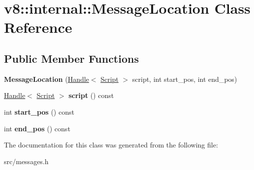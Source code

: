 \hypertarget{classv8_1_1internal_1_1_message_location}{}\section{v8\+:\+:internal\+:\+:Message\+Location Class Reference}
\label{classv8_1_1internal_1_1_message_location}
\subsection*{Public Member Functions}
\begin{DoxyCompactItemize}
\item 
\hypertarget{classv8_1_1internal_1_1_message_location_ab3acbbdff769f414fbae9f269e805e06}{}{\bfseries Message\+Location} (\hyperlink{classv8_1_1internal_1_1_handle}{Handle}$<$ \hyperlink{classv8_1_1internal_1_1_script}{Script} $>$ script, int start\+\_\+pos, int end\+\_\+pos)\label{classv8_1_1internal_1_1_message_location_ab3acbbdff769f414fbae9f269e805e06}

\item 
\hypertarget{classv8_1_1internal_1_1_message_location_aa98b33884231005b9cfed256d8419ad1}{}\hyperlink{classv8_1_1internal_1_1_handle}{Handle}$<$ \hyperlink{classv8_1_1internal_1_1_script}{Script} $>$ {\bfseries script} () const \label{classv8_1_1internal_1_1_message_location_aa98b33884231005b9cfed256d8419ad1}

\item 
\hypertarget{classv8_1_1internal_1_1_message_location_aa22e9e2ef0cee82c768d66a65c7f318f}{}int {\bfseries start\+\_\+pos} () const \label{classv8_1_1internal_1_1_message_location_aa22e9e2ef0cee82c768d66a65c7f318f}

\item 
\hypertarget{classv8_1_1internal_1_1_message_location_aca7e0f537ff0eccbfb2c9b586890968f}{}int {\bfseries end\+\_\+pos} () const \label{classv8_1_1internal_1_1_message_location_aca7e0f537ff0eccbfb2c9b586890968f}

\end{DoxyCompactItemize}


The documentation for this class was generated from the following file\+:\begin{DoxyCompactItemize}
\item 
src/messages.\+h\end{DoxyCompactItemize}
